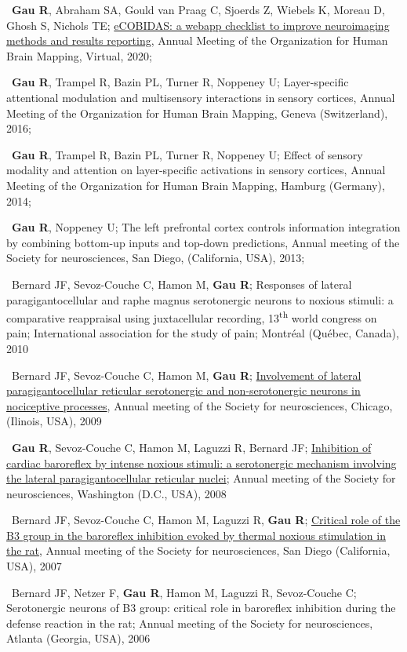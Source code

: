 \textbullet~\textbf{Gau R}, Abraham SA, Gould van Praag C, Sjoerds Z, Wiebels K, Moreau D, Ghosh S, Nichols TE;
\href{https://osf.io/k8pe6/}{eCOBIDAS: a webapp checklist to improve neuroimaging methods and results reporting},
Annual Meeting of the Organization for Human Brain Mapping, Virtual,
2020;

\textbullet~\textbf{Gau R}, Trampel R, Bazin PL, Turner R, Noppeney U;
Layer-specific attentional modulation and multisensory interactions in sensory cortices,
Annual Meeting of the Organization for Human Brain Mapping, Geneva (Switzerland),
2016;

\textbullet~\textbf{Gau R}, Trampel R, Bazin PL, Turner R, Noppeney U;
Effect of sensory modality and attention on layer-specific activations in sensory cortices,
Annual Meeting of the Organization for Human Brain Mapping, Hamburg (Germany),
2014;

\textbullet~\textbf{Gau R}, Noppeney U; The left prefrontal cortex controls information integration 
by combining bottom-up inputs and top-down predictions,
Annual meeting of the Society for neurosciences,
San Diego, (California, USA),
2013;

\textbullet~Bernard JF, Sevoz-Couche C, Hamon M, \textbf{Gau R}; 
Responses of lateral paragigantocellular and raphe magnus serotonergic neurons to noxious stimuli: 
a comparative reappraisal using juxtacellular recording,
13\textsuperscript{th} world congress on pain; International association for the study of pain;
Montréal (Québec, Canada),
2010

\textbullet~Bernard JF, Sevoz-Couche C, Hamon M, \textbf{Gau R}; 
\href{https://osf.io/efqub/}{Involvement of lateral paragigantocellular reticular serotonergic 
and non-serotonergic neurons in nociceptive processes},
Annual meeting of the Society for neurosciences,
Chicago, (Ilinois, USA),
2009

\textbullet~\textbf{Gau R}, Sevoz-Couche C, Hamon M, Laguzzi R, Bernard JF;
\href{https://osf.io/hxkgv/}{Inhibition of cardiac baroreflex by intense noxious stimuli: 
a serotonergic mechanism involving the lateral paragigantocellular reticular nuclei};
Annual meeting of the Society for neurosciences,
Washington (D.C., USA),
2008

\textbullet~Bernard JF, Sevoz-Couche C, Hamon M, Laguzzi R, \textbf{Gau R};
\href{https://osf.io/4rjst/}{Critical role of the B3 group in the baroreflex inhibition evoked 
by thermal noxious stimulation in the rat},
Annual meeting of the Society for neurosciences,
San Diego (California, USA),
2007

\textbullet~Bernard JF, Netzer F, \textbf{Gau R}, Hamon M, Laguzzi R, Sevoz-Couche C;
Serotonergic neurons of B3 group: critical role in baroreflex inhibition 
during the defense reaction in the rat;
Annual meeting of the Society for neurosciences,
Atlanta (Georgia, USA),
2006

